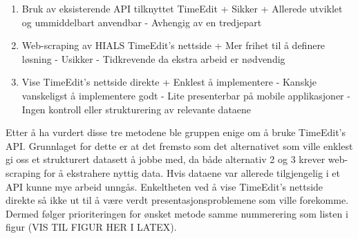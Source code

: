 \documentclass[../main.tex]{subfiles}
\begin{document}
\begin{enumerate}
\item Bruk av eksisterende API tilknyttet TimeEdit\newline
+ Sikker\newline
+ Allerede utviklet og ummiddelbart anvendbar\newline
-  Avhengig av en tredjepart\newline
\item Web-scraping av HIALS TimeEdit’s nettside\newline
+ Mer frihet til å definere løsning\newline
-  Usikker\newline
-  Tidkrevende da ekstra arbeid er nødvendig\newline
\item Vise TimeEdit’s nettside direkte\newline
+ Enklest å implementere\newline
-  Kanskje vanskeligst å implementere godt\newline
-  Lite presenterbar på mobile applikasjoner\newline
-  Ingen kontroll eller strukturering av relevante dataene\newline
\end{enumerate}

Etter å ha vurdert disse tre metodene ble gruppen enige om å bruke TimeEdit’s API. Grunnlaget for dette er at det fremsto som det alternativet som ville enklest gi oss et strukturert datasett å jobbe med, da både alternativ 2 og 3 krever web-scraping for å ekstrahere nyttig data. Hvis dataene var allerede tilgjengelig i et API kunne mye arbeid unngås. Enkeltheten ved å vise TimeEdit’s nettside direkte så ikke ut til å være verdt presentasjonsproblemene som ville forekomme. Dermed følger prioriteringen for ønsket metode samme nummerering som listen i figur (VIS TIL FIGUR HER I LATEX).
\end{document}
